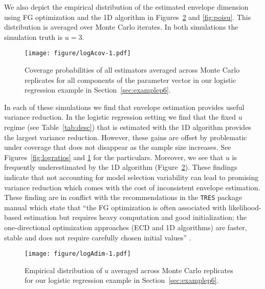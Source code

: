 \documentclass{article}\usepackage[]{graphicx}\usepackage[]{color}
\begin{document}
We also depict the empirical distribution of the estimated envelope dimension using FG optimization and the 1D algorithm in Figures~\ref{fig:logu} and \ref{fig:poisu}. This distribution is averaged over Monte Carlo iterates. In both simulations the simulation truth is $u = 3$.

\begin{figure}[h!]
	\texttt{[image: figure/logAcov-1.pdf]}
	\caption{Coverage probabilities of all estimators averaged across Monte Carlo replicates for all components of the parameter vector in our logistic regression example in Section~\ref{sec:examplep6}.}
	\label{fig:logcov}
\end{figure}


In each of these simulations we find that envelope estimation provides useful variance reduction. In the logistic regression setting we find that the fixed $u$ regime (see Table~\ref{tab:desc}) that is estimated with the 1D algorithm provides the largest variance reduction. However, these gains are offset by problematic under coverage that does not disappear as the sample size increases. See Figures~\ref{fig:logratios} and \ref{fig:logcov} for the particulars. Moreover, we see that $u$ is frequently underestimated by the 1D algorithm (Figure~\ref{fig:logu}). These findings indicate that not accounting for model selection variability can lead to promising variance reduction which comes with the cost of inconsistent envelope estimation. These finding are in conflict with the recommendations in the \texttt{TRES} package manual which state that ``the FG optimization is often associated with likelihood-based estimation but requires heavy computation and good initialization;  the one-directional optimization approaches (ECD \citep{cook2018fast} and 1D algorithms) are faster, stable and does not require carefully chosen initial values'' \citep{zeng2019TRES}. 


\begin{figure}[h!]
	\texttt{[image: figure/logAdim-1.pdf]}
	\caption{Empirical distribution of $u$ averaged across Monte Carlo replicates for our logistic regression example in Section~\ref{sec:examplep6}.}
	\label{fig:logu}
\end{figure}
\end{document}
